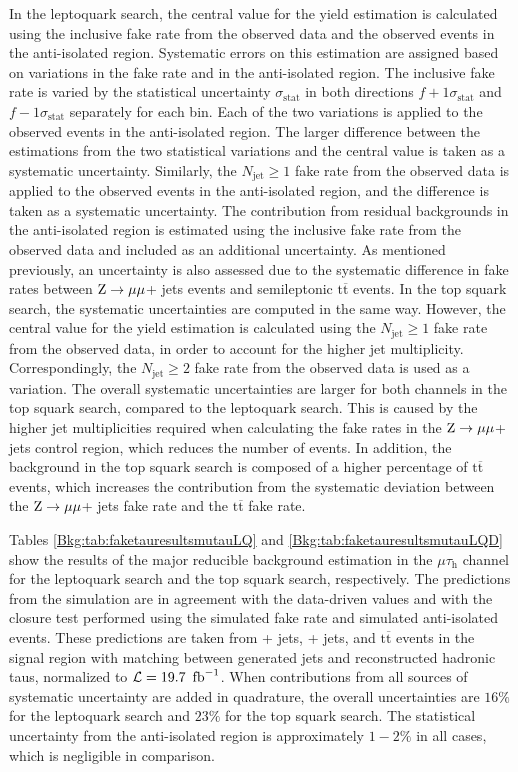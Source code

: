 \documentclass[12pt]{thesis}  %
\newcommand{\tauh}{\ensuremath{\tau_{\text{h}}}\xspace}
\newcommand{\mutau}{\ensuremath{\mu\tauh}\xspace}
\renewcommand{\ttbar}{\ensuremath{\mathrm{t}\overline{\mathrm{t}}}\xspace}
\newcommand{\ra}{\ensuremath{\rightarrow}}%
\newcommand{\Zmm}{\ensuremath{\Z \ra \mu\mu}\xspace}%
\newcommand{\thelumi}{\ensuremath{19.7~\fbinv}\xspace}
\begin{document}
In the leptoquark search, the central value for the yield estimation is calculated using the inclusive fake rate from the observed data and the observed events in the anti-isolated region. Systematic errors on this estimation are assigned based on variations in the fake rate and in the anti-isolated region. The inclusive fake rate is varied by the statistical uncertainty $\sigma_{\text{stat}}$ in both directions $f+1\sigma_{\text{stat}}$ and $f-1\sigma_{\text{stat}}$ separately for each bin. Each of the two variations is applied to the observed events in the anti-isolated region. The larger difference between the estimations from the two statistical variations and the central value is taken as a systematic uncertainty. Similarly, the $N_{\text{jet}} \geq 1$ fake rate from the observed data is applied to the observed events in the anti-isolated region, and the difference is taken as a systematic uncertainty. The contribution from residual backgrounds in the anti-isolated region is estimated using the inclusive fake rate from the observed data and included as an additional uncertainty. As mentioned previously, an uncertainty is also assessed due to the systematic difference in fake rates between \Zmm + jets events and semileptonic \ttbar events. In the top squark search, the systematic uncertainties are computed in the same way. However, the central value for the yield estimation is calculated using the $N_{\text{jet}} \geq 1$ fake rate from the observed data, in order to account for the higher jet multiplicity. Correspondingly, the $N_{\text{jet}} \geq 2$ fake rate from the observed data is used as a variation. The overall systematic uncertainties are larger for both channels in the top squark search, compared to the leptoquark search. This is caused by the higher jet multiplicities required when calculating the fake rates in the \Zmm + jets control region, which reduces the number of events. In addition, the background in the top squark search is composed of a higher percentage of \ttbar events, which increases the contribution from the systematic deviation between the \Zmm + jets fake rate and the \ttbar fake rate.

Tables \ref{Bkg:tab:faketauresultsmutauLQ} and \ref{Bkg:tab:faketauresultsmutauLQD} show the results of the major reducible background estimation in the \mutau channel for the leptoquark search and the top squark search, respectively. The predictions from the simulation are in agreement with the data-driven values and with the closure test performed using the simulated fake rate and simulated anti-isolated events. These predictions are taken from \W + jets, \Z + jets, and \ttbar events in the signal region with matching between generated jets and reconstructed hadronic taus, normalized to $\lumi = \thelumi$. When contributions from all sources of systematic uncertainty are added in quadrature, the overall uncertainties are $16\%$ for the leptoquark search and $23\%$ for the top squark search. The statistical uncertainty from the anti-isolated region is approximately $1-2\%$ in all cases, which is negligible in comparison.
\end{document}
